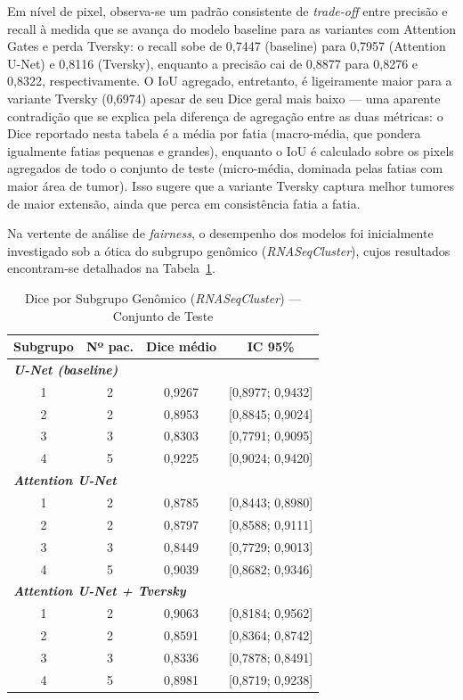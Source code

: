 \documentclass[conference]{IEEEtran}
\begin{document}
Em nível de pixel, observa-se um padrão consistente de \textit{trade-off} entre precisão e recall à medida que se avança do modelo baseline para as variantes com Attention Gates e perda Tversky: o recall sobe de 0,7447 (baseline) para 0,7957 (Attention U-Net) e 0,8116 (Tversky), enquanto a precisão cai de 0,8877 para 0,8276 e 0,8322, respectivamente. O IoU agregado, entretanto, é ligeiramente maior para a variante Tversky (0,6974) apesar de seu Dice geral mais baixo --- uma aparente contradição que se explica pela diferença de agregação entre as duas métricas: o Dice reportado nesta tabela é a média por fatia (macro-média, que pondera igualmente fatias pequenas e grandes), enquanto o IoU é calculado sobre os pixels agregados de todo o conjunto de teste (micro-média, dominada pelas fatias com maior área de tumor). Isso sugere que a variante Tversky captura melhor tumores de maior extensão, ainda que perca em consistência fatia a fatia.

Na vertente de análise de \textit{fairness}, o desempenho dos modelos foi inicialmente investigado sob a ótica do subgrupo genômico (\textit{RNASeqCluster}), cujos resultados encontram-se detalhados na Tabela~\ref{tab:fairness_rna}. 

\begin{table}[ht!]
\centering
\footnotesize
\setlength{\tabcolsep}{4pt}
\caption{Dice por Subgrupo Genômico (\textit{RNASeqCluster}) --- Conjunto de Teste}
\label{tab:fairness_rna}
\begin{tabular}{c c c c}
\hline
\textbf{Subgrupo} & \textbf{Nº pac.} & \textbf{Dice médio} & \textbf{IC 95\%} \\
\hline
\multicolumn{4}{l}{\textit{\textbf{U-Net (baseline)}}} \\
1 & 2 & 0,9267 & [0,8977; 0,9432] \\
2 & 2 & 0,8953 & [0,8845; 0,9024] \\
3 & 3 & 0,8303 & [0,7791; 0,9095] \\
4 & 5 & 0,9225 & [0,9024; 0,9420] \\
\hline
\multicolumn{4}{l}{\textit{\textbf{Attention U-Net}}} \\
1 & 2 & 0,8785 & [0,8443; 0,8980] \\
2 & 2 & 0,8797 & [0,8588; 0,9111] \\
3 & 3 & 0,8449 & [0,7729; 0,9013] \\
4 & 5 & 0,9039 & [0,8682; 0,9346] \\
\hline
\multicolumn{4}{l}{\textit{\textbf{Attention U-Net + Tversky}}} \\
1 & 2 & 0,9063 & [0,8184; 0,9562] \\
2 & 2 & 0,8591 & [0,8364; 0,8742] \\
3 & 3 & 0,8336 & [0,7878; 0,8491] \\
4 & 5 & 0,8981 & [0,8719; 0,9238] \\
\hline
\end{tabular}
\end{table}
\end{document}
